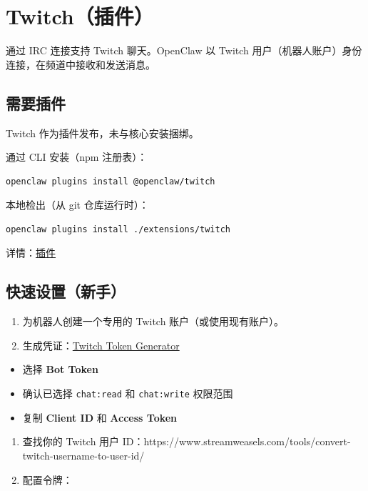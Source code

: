 \clearpage

\section{Twitch（插件）}


通过 IRC 连接支持 Twitch 聊天。OpenClaw 以 Twitch 用户（机器人账户）身份连接，在频道中接收和发送消息。

\subsection{需要插件}


Twitch 作为插件发布，未与核心安装捆绑。

通过 CLI 安装（npm 注册表）：

\begin{lstlisting}[language=bash]
openclaw plugins install @openclaw/twitch
\end{lstlisting}


本地检出（从 git 仓库运行时）：

\begin{lstlisting}[language=bash]
openclaw plugins install ./extensions/twitch
\end{lstlisting}


详情：\href{/tools/plugin}{插件}

\subsection{快速设置（新手）}


\begin{enumerate}
  \item 为机器人创建一个专用的 Twitch 账户（或使用现有账户）。
  \item 生成凭证：\href{https://twitchtokengenerator.com/}{Twitch Token Generator}
\end{enumerate}

\begin{itemize}
  \item 选择 \textbf{Bot Token}
  \item 确认已选择 \texttt{chat:read} 和 \texttt{chat:write} 权限范围
  \item 复制 \textbf{Client ID} 和 \textbf{Access Token}
\end{itemize}

\begin{enumerate}
  \item 查找你的 Twitch 用户 ID：https://www.streamweasels.com/tools/convert-twitch-username-to-user-id/
  \item 配置令牌：
\end{enumerate}

